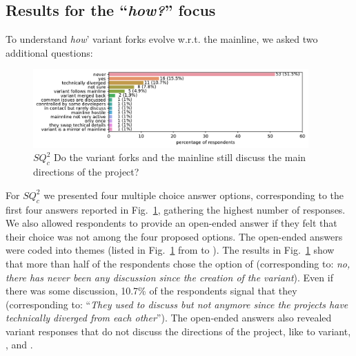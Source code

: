
\subsection{Results for the ``\emph{how?}'' focus}

To understand \emph{how}' variant forks evolve w.r.t. the mainline,
we asked two additional questions:

\noindent \rqTwoThree

\noindent \rqTwoFour


\begin{figure}[ht]
\begin{center}
    \centering
    \includegraphics[width=\columnwidth,height=3cm]{pdfs/discussions_rq3_colored.pdf}
    \caption{$SQ^2_{c}$ Do the variant forks and the mainline still discuss the main directions of the project?}
    \label{fig:discussions}
\end{center}
\vspace{-.3cm}
\end{figure}

\nd For $SQ^2_{c}$ we presented four multiple choice answer options, corresponding to the first four answers reported in Fig.~\ref{fig:discussions}, gathering the highest number of responses.
We also allowed respondents to provide an open-ended answer if they felt that their choice was not among the four proposed options. The open-ended answers were coded into themes (listed in Fig.~\ref{fig:discussions} from \ra to ).
The results in Fig.~\ref{fig:discussions} show that more than half of the respondents chose the option of  (corresponding to: \textit{no, there has never been any discussion since the creation of the variant}). 
Even if there was some discussion, 10.7\% of the respondents signal that they 
 (corresponding to: ``\emph{They used to discuss but not anymore since the projects have technically diverged from each other}'').
The open-ended answers also revealed variant responses that do not discuss the directions of the project, like  to variant,  ,   and .

